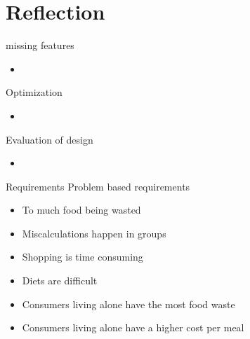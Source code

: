 \section{Reflection}

\begin{frame}{missing features}%
	\begin{itemize}
		\item
	\end{itemize}
\end{frame}

\begin{frame}{Optimization}
	\begin{itemize}
		\item
	\end{itemize}
\end{frame}

\begin{frame}{Evaluation of design}
	\begin{itemize}
		\item
	\end{itemize}
\end{frame}

\begin{frame}{Requirements}%
	Problem based requirements
	\begin{itemize}
		\item To much food being wasted
		\item Miscalculations happen in groups
		\item Shopping is time consuming
		\item Diets are difficult
		\item Consumers living alone have the most food waste
		\item Consumers living alone have a higher cost per meal
	\end{itemize}
\end{frame}
